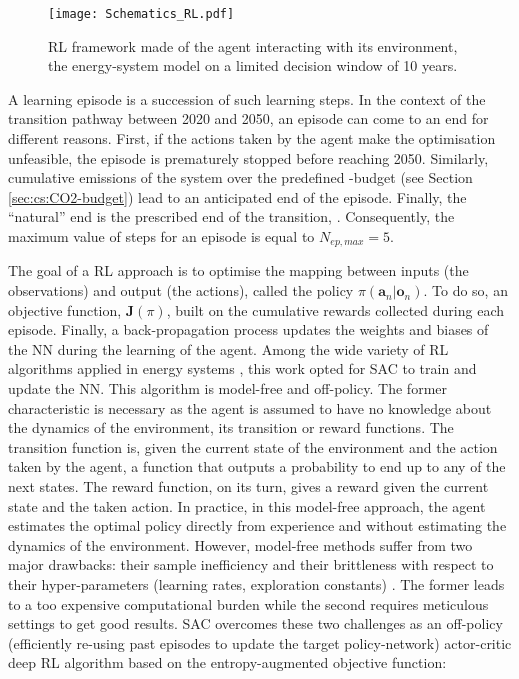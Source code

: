 \begin{figure}[!htbp]
\centering
\texttt{[image: Schematics\_RL.pdf]}
\caption{\acrfull{RL} framework made of the agent interacting with its environment, \ie the energy-system model on a limited decision window of 10 years.}
\label{fig:Schematics_RL}
\end{figure}

A learning episode is a succession of such learning steps. In the context of the transition pathway between 2020 and 2050, an episode can come to an end for different reasons. First, if the actions taken by the agent make the optimisation unfeasible, the episode is prematurely stopped before reaching 2050. Similarly, cumulative emissions of the system over the predefined -budget (see Section \ref{sec:cs:CO2-budget}) lead to an anticipated end of the episode. Finally, the ``natural'' end is the prescribed end of the transition, . Consequently, the maximum value of steps for an episode is equal to $N_{ep,max}=5$. 

The goal of a \gls{RL} approach is to optimise the mapping between inputs (\ie the observations) and output (\ie the actions), called the policy $\pi\left(\bm{a}_n | \bm{o}_n\right)$. To do so, an objective function, $\bm{J}(\pi)$, built on the cumulative rewards collected during each episode. Finally, a back-propagation process updates the weights and biases of the \gls{NN} during the learning of the agent. Among the wide variety of \gls{RL} algorithms applied in energy systems \cite{perera2021applications}, this work opted for \gls{SAC} \cite{haarnoja2018soft} to train and update the \gls{NN}. This algorithm is model-free and off-policy. The former characteristic is necessary as the agent is assumed to have no knowledge about the dynamics of the environment, \ie its transition or reward functions. The transition function is, given the current state of the environment and the action taken by the agent, a function that outputs a probability to end up to any of the next states. The reward function, on its turn, gives a reward given the current state and the taken action. In practice, in this model-free approach, the agent estimates the optimal policy directly from experience and without estimating the dynamics of the environment. However, model-free methods suffer from two major drawbacks: their sample inefficiency and their brittleness with respect to their hyper-parameters (\eg learning rates, exploration constants) \cite{haarnoja2018soft}. The former leads to a too expensive computational burden while the second requires meticulous settings to get good results. \gls{SAC} overcomes these two challenges as an off-policy (\ie efficiently re-using past episodes to update the target policy-network) actor-critic deep \gls{RL} algorithm based on the entropy-augmented objective function: 

